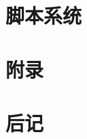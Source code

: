\documentclass[
    UTF8,       %
    b5paper,    %
    10pt,       %
    oneside,    %
    openright,  %
    titlepage,  %
    final       %
]{ctexbook}
\begin{document}
    \chapter{脚本系统}

    \appendix
    \maketitle
    \chapter{附录}


    \backmatter
    \chapter{后记}

\end{document}
